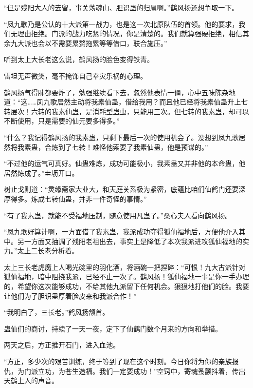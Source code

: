 
\begin{this_body}



“但是残阳大人的去留，事关荡魂山、胆识蛊的归属啊。”鹤风扬还想争取一下。

“凤九歌乃是公认的十大派第一战力，也是这一次北原队伍的首领。他的要求，我们无理由拒绝。门派的战力吃紧的情况，你是清楚的。我们就算强硬拒绝，相信其余九大派也会以不需要累赘拖累等等借口，联合施压。”

听到太上大长老这么说，鹤风扬的脸色变得铁青。

雷坦无声微笑，毫不掩饰自己幸灾乐祸的心理。

鹤风扬气得肺都要炸了，勉强继续看下去，忽然他表情一僵，心中五味陈杂地道：“这……凤九歌居然主动将我素仙蛊，借给我用？而且他已经将我素仙蛊升上七转层次！六转的我素仙蛊，是消耗型蛊虫，只能用三次。但七转的我素蛊，却可以不断使用，只是需要的仙元要多得多。”

“什么？我记得鹤风扬的我素蛊，只剩下最后一次的使用机会了。没想到凤九歌居然将我素蛊，合炼到了七转！难怪他索要了我素仙蛊，他是预谋的。”

“不过他的运气可真好。仙蛊难炼，成功可能极小，我素蛊又并非他的本命蛊，他居然炼成了。”圭坜开口。

树止戈则道：“灵缘斋家大业大，和天庭关系极为紧密，底蕴比咱们仙鹤门还要深厚得多。炼成七转仙蛊，并非一件奇怪的事情。”

“有了我素蛊，就能不受福地压制，随意使用凡蛊了。”桑心夫人看向鹤风扬。

“凤九歌好算计啊，一方面借了我素蛊，我派成功夺得狐仙福地后，方便他介入其中。另一方面又抽调了残阳老祖出去，事实上是降低了本次我派进攻狐仙福地的实力。”太上二长老分析着。

太上三长老虎魔上人喝光碗里的羽化酒，将酒碗一把捏碎：“可恨！九大古派针对狐仙福地，暗中阻挠我派，已经不止一次了。鹤风扬！狐仙福地一事是你一手办理的，希望你这次能够成功，不给其他九派留下任何机会。狠狠地打他们的脸。我要让他们为了胆识蛊厚着脸皮来和我派合作！”

“我明白了，三长老。”鹤风扬颔首。

蛊仙们的商讨，持续了一天一夜，定下了仙鹤门数个月来的方向和举措。

两天之后，方正推开石门，进入血池。

“方正，多少次的艰苦训练，终于等到了现在这个时刻。今日你将为你的亲族报仇，为门派立功，为苍生造福。我们一定要成功！”空窍中，寄魂蚤颤抖着，传出天鹤上人的声音。


\end{this_body}
